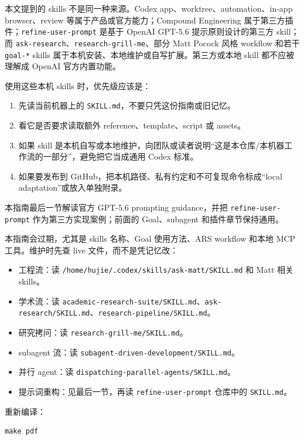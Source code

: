 \documentclass[UTF8,a4paper,11pt,fontset=none]{ctexart}
\newcommand{\skill}[1]{\texttt{#1}}
\newcommand{\file}[1]{\texttt{#1}}
\begin{document}
本文提到的 skills 不是同一种来源。Codex app、worktree、automation、in-app browser、review 等属于产品或官方能力；Compound Engineering 属于第三方插件；\skill{refine-user-prompt} 是基于 OpenAI GPT-5.6 提示原则设计的第三方 skill；而 \skill{ask-research}、\skill{research-grill-me}、部分 Matt Pocock 风格 workflow 和若干 \file{goal-*} skills 属于本机安装、本地维护或自写扩展。第三方或本地 skill 都不应被理解成 OpenAI 官方内置功能。

使用这些本机 skills 时，优先级应该是：

\begin{enumerate}
  \item 先读当前机器上的 \file{SKILL.md}，不要只凭这份指南或旧记忆。
  \item 看它是否要求读取额外 reference、template、script 或 assets。
  \item 如果 skill 是本机自写或本地维护，向团队或读者说明“这是本仓库/本机器工作流的一部分”，避免把它当成通用 Codex 标准。
  \item 如果要发布到 GitHub，把本机路径、私有约定和不可复现命令标成“local adaptation”或放入单独附录。
\end{enumerate}

本指南最后一节解读官方 GPT-5.6 prompting guidance，并把 \skill{refine-user-prompt} 作为第三方实现案例；前面的 Goal、subagent 和插件章节保持通用。

本指南会过期，尤其是 skills 名称、Goal 使用方法、ARS workflow 和本地 MCP 工具。维护时先查 live 文件，而不是凭记忆改：

\begin{itemize}
  \item 工程流：读 \file{/home/hujie/.codex/skills/ask-matt/SKILL.md} 和 Matt 相关 skills。
  \item 学术流：读 \file{academic-research-suite/SKILL.md}、\file{ask-research/SKILL.md}、\file{research-pipeline/SKILL.md}。
  \item 研究拷问：读 \file{research-grill-me/SKILL.md}。
  \item subagent 流：读 \file{subagent-driven-development/SKILL.md}。
  \item 并行 agent：读 \file{dispatching-parallel-agents/SKILL.md}。
  \item 提示词重构：见最后一节，再读 \skill{refine-user-prompt} 仓库中的 \file{SKILL.md}。
\end{itemize}

重新编译：

\begin{lstlisting}
make pdf
\end{lstlisting}
\end{document}
